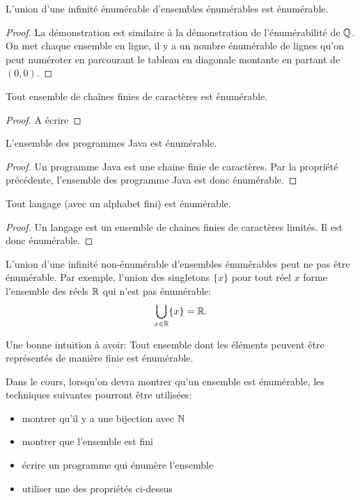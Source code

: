 \begin{myprop}
	L'union d'une infinité énumérable d'ensembles énumérables est énumérable.
    \begin{proof}
      La démonstration est similaire à la démonstration de l'énumérabilité de $\mathbb{Q}$.
      On met chaque ensemble en ligne, il y a un nombre énumérable de lignes qu'on peut numéroter en parcourant le tableau en diagonale montante en partant de $(0,0)$.
    \end{proof}
\end{myprop}

\begin{myprop}
 Tout ensemble  de chaînes finies de caractères est énumérable.
 \begin{proof}
	A écrire
 \end{proof}
\end{myprop}

\begin{myprop}
 L'ensemble des programmes Java est énumérable.
 \begin{proof}
  Un programme Java est une chaine finie de caractères.  Par la propriété précédente, l'ensemble des programme Java est  donc énumérable.
 \end{proof}
\end{myprop}


\begin{myprop}
 Tout langage (avec un alphabet fini) est énumérable. 
 \begin{proof}
 Un langage est un ensemble de chaines finies de caractères limités.  Il est donc  énumérable.
 \end{proof}
\end{myprop}

L'union d'une infinité non-énumérable d'ensembles énumérables peut ne pas être énumérable.
Par exemple, l'union des singletons $\{x\}$ pour tout réel $x$ forme l'ensemble des réels $\mathbb{R}$ qui n'est pas énumérable:
\[ \bigcup_{x \in \mathbb{R}} \{x\} = \mathbb{R}. \]

\begin{myrem}
  Une bonne intuition à avoir:
  Tout ensemble dont les éléments peuvent être représentés de manière finie est énumérable.
\end{myrem}

Dans le cours, lorsqu'on devra montrer qu'un ensemble est énumérable,
les techniques suivantes pourront être utilisées:
\begin{itemize}
	\item montrer qu'il y a une bijection avec $\mathbb{N}$ 
	\item montrer que l'ensemble est fini
	\item écrire un programme qui énumère l'ensemble
	\item utiliser une des propriétés ci-dessus
\end{itemize}

